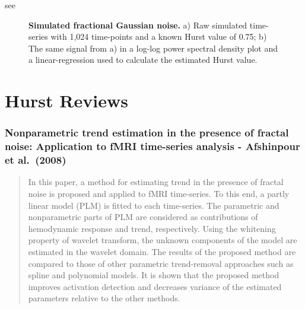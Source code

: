 \documentclass[
  sn-vancouver,
  Numbered,
  referee,
  lineno]{sn-jnl}
\begin{document}
see \citet{tanabeComparisonDetrendingMethods2002}

\label{cell-fig-scaleinvariance}
\begin{figure}[H]


\caption{\label{fig-scaleinvariance}\textbf{Simulated fractional
Gaussian noise.} a) Raw simulated time-series with 1,024 time-points and
a known Hurst value of 0.75; b) The same signal from a) in a log-log
power spectral density plot and a linear-regression used to calculate
the estimated Hurst value.}

\end{figure}%

\section{Hurst Reviews}\label{hurst-reviews-2}

\subsubsection{\texorpdfstring{Nonparametric trend estimation in the
presence of fractal noise: Application to fMRI time-series analysis -
Afshinpour et al.~(2008)
\citep{afshinpourNonparametricTrendEstimation2008}}{Nonparametric trend estimation in the presence of fractal noise: Application to fMRI time-series analysis - Afshinpour et al.~(2008) {[}@afshinpourNonparametricTrendEstimation2008{]}}}\label{nonparametric-trend-estimation-in-the-presence-of-fractal-noise-application-to-fmri-time-series-analysis---afshinpour-et-al.-2008-afshinpournonparametrictrendestimation2008-2}

\begin{quote}
In this paper, a method for estimating trend in the presence of fractal
noise is proposed and applied to fMRI time-series. To this end, a partly
linear model (PLM) is fitted to each time-series. The parametric and
nonparametric parts of PLM are considered as contributions of
hemodynamic response and trend, respectively. Using the whitening
property of wavelet transform, the unknown components of the model are
estimated in the wavelet domain. The results of the proposed method are
compared to those of other parametric trend-removal approaches such as
spline and polynomial models. It is shown that the proposed method
improves activation detection and decreases variance of the estimated
parameters relative to the other methods.
\end{quote}
\end{document}

